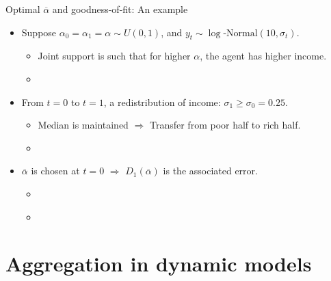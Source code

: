 \documentclass[10pt, handout]{beamer}
\begin{document}
\begin{frame}[label=RA-Example]{Optimal $\overline{\alpha}$ and goodness-of-fit: An example}
	\vfill
	\begin{itemize}
		\item Suppose $\alpha_{0} = \alpha_{1} = \alpha \sim U(0,1)$, and $y_{t} \sim \log\text{-Normal}(10, \sigma_{t})$.\vspace{1ex}
			\begin{itemize}
				\item Joint support is such that for higher $\alpha$, the agent has higher income. \vspace{1ex}
				\item \hyperlink{SupportRA}{}
			\end{itemize}\vfill
		
		\item From $t = 0$ to $t = 1$, a redistribution of income: $\sigma_{1} \geq \sigma_{0} = 0.25$.\vspace{1ex}
			\begin{itemize}
				\item Median is maintained $\Rightarrow$ Transfer from poor half to rich half. \vspace{1ex}
				\item \hyperlink{DensityRA}{} 
			\end{itemize} \vfill
			
		\item $\overline{\alpha}$ is chosen at $t = 0$ $\Rightarrow$ $D_{1}(\overline{\alpha})$ is the associated error.\vspace{1ex}
			\begin{itemize}
				\item \hyperlink{alphaBar-RA}{} \vspace{1ex}
				\item \hyperlink{Dt-RA}{} 
			\end{itemize} \vfill

	\end{itemize}

\end{frame}



\section{Aggregation in dynamic models}
\end{document}
